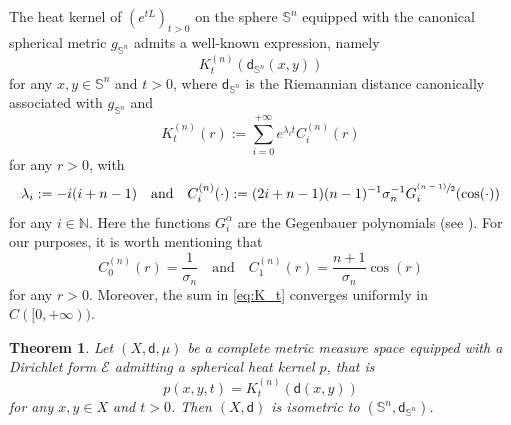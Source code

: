 \documentclass[10pt]{amsart}
\newcommand{\psfrac}[2]{\sfrac{(#1)}{#2}}
\theoremstyle{plain}
\newtheorem{theorem}{Theorem}[section]
\theoremstyle{definition}
\newcommand{\setN}{\mathbb{N}}
\newcommand{\cE}{\mathcal{E}}
\newcommand{\dist}{\mathsf{d}}
\begin{document}
The heat kernel of $(e^{tL})_{t>0}$ on the sphere $\mathbb{S}^n$ equipped with the canonical spherical metric $g_{\mathbb{S}^n}$ admits a well-known expression, namely\vspace*{-3pt}
\[
K_t^{(n)}(\dist_{\mathbb{S}^n}(x,y))
\]
for any $x,y \in \mathbb{S}^n$ and $t>0$, where $\dist_{\mathbb{S}^n}$ is the Riemannian distance canonically associated with $g_{\mathbb{S}^n}$ and\vspace*{-5pt}
\begin{equation}\label{eq:K_t}
K_t^{(n)}(r):=\sum_{i=0}^{+\infty} e^{\lambda_i t} C_i^{(n)}(r)\end{equation}
for any $r>0$, with
\[
\lambda_i:= -i(i+n-1)\quad\text{and}\quad
C_i^{(n)}(\cdot):=(2i+n-1)(n-1)^{-1}\sigma_n^{-1} G_i^{\psfrac{n-1}{2}}(\cos(\cdot))
\]
for any $i \in \setN$. Here the functions $G_i^\alpha$ are the Gegenbauer polynomials (see \eg \cite{AtkinsonHan}). For our purposes, it is worth mentioning that
\[
C_0^{(n)}(r)=\frac{1}{\sigma_n} \quad \text{and} \quad C_1^{(n)}(r)=\frac{n+1}{\sigma_n}\cos(r)
\]
for any $r>0$. Moreover, the sum in \eqref{eq:K_t} converges uniformly in $C([0,+\infty))$.

\begin{theorem}
Let $(X,\dist,\mu)$ be a complete metric measure space equipped with a Dirichlet form $\cE$ admitting a spherical heat kernel $p$, that is
\begin{equation}\label{eq:spher}
p(x,y,t) = K_t^{(n)}(\dist(x,y))
\end{equation}
for any $x, y \in X$ and $t>0$. Then $(X,\dist)$ is isometric to $(\mathbb{S}^n,\dist_{\mathbb{S}^n})$.
\end{theorem}
\end{document}
